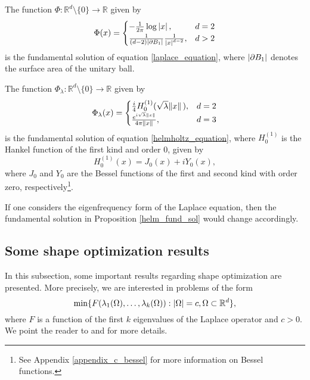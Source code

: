 \begin{proposition}
    The function \(\Phi: \mathbb{R}^d \setminus \{0\} \rightarrow \mathbb{R}\) given by
    \[
    \Phi(x) = \begin{cases}
        -\frac{1}{2 \pi} \log \abs*{x}, & d=2\\
        \frac{1}{(d-2)\abs{\partial B_1}}\frac{1}{\abs*{x}^{d-2}}, & d > 2
    \end{cases}
    \]
    is the fundamental solution of equation \eqref{laplace_equation}, where \(\abs{\partial B_1}\) denotes the surface area of the unitary ball.
\end{proposition}
\begin{proposition}\label{helm_fund_sol}
    The function \(\Phi_\lambda: \mathbb{R}^d \setminus \{0\} \rightarrow \mathbb{R}\) given by
    \[
    \Phi_\lambda(x) = \begin{cases}
        \frac{i}{4} H_0^{(1)}(\sqrt{\lambda} \norm*{x}), & d=2\\
        \frac{e^{i \sqrt{\lambda} \norm*{x}}}{4 \pi \norm*{x}}, & d = 3
    \end{cases}
    \]
    is the fundamental solution of equation \eqref{helmholtz_equation}, where \(H_0^{(1)}\) is the Hankel function of the first kind and order 0, given by
    \[
        H_0^{(1)}(x) = J_0(x) + i Y_0(x),
    \]
    where \(J_0\) and \(Y_0\) are the Bessel functions of the first and second kind with order zero, respectively\footnote{See Appendix \ref{appendix_c_bessel} for more information on Bessel functions.}.
\end{proposition}

If one considers the eigenfrequency form of the Laplace equation, then the fundamental solution in Proposition \ref{helm_fund_sol} would change accordingly.

\subsection{Some shape optimization results}

In this subsection, some important results regarding shape optimization are presented. More precisely, we are interested in problems of the form
\begin{equation}\label{shape_prob}
    \min\{F(\lambda_1(\Omega),\dots, \lambda_k(\Omega)): \abs{\Omega} = c, \Omega \subset \mathbb{R}^d\},
\end{equation}
where \(F\) is a function of the first \(k\) eigenvalues of the Laplace operator and \(c > 0\). We point the reader to \cite{henrot2006extremum} and \cite{henrot2017shape} for more details.

